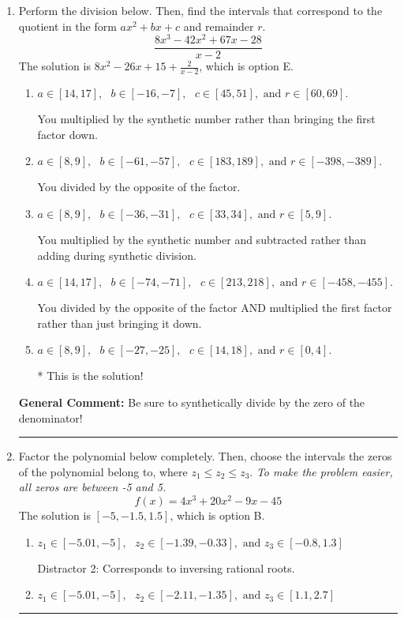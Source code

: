 \documentclass{extbook}[14pt]
\newcommand{\litem}[1]{\item #1

\rule{\textwidth}{0.4pt}}
\begin{document}
\begin{enumerate}\litem{
Perform the division below. Then, find the intervals that correspond to the quotient in the form $ax^2+bx+c$ and remainder $r$.
\[ \frac{8x^{3} -42 x^{2} +67 x -28}{x -2} \]The solution is \( 8x^{2} -26 x + 15 + \frac{2}{x -2} \), which is option E.\begin{enumerate}[label=\Alph*.]
\item \( a \in [14, 17], \text{   } b \in [-16, -7], \text{   } c \in [45, 51], \text{   and   } r \in [60, 69]. \)

 You multiplied by the synthetic number rather than bringing the first factor down.
\item \( a \in [8, 9], \text{   } b \in [-61, -57], \text{   } c \in [183, 189], \text{   and   } r \in [-398, -389]. \)

 You divided by the opposite of the factor.
\item \( a \in [8, 9], \text{   } b \in [-36, -31], \text{   } c \in [33, 34], \text{   and   } r \in [5, 9]. \)

 You multiplied by the synthetic number and subtracted rather than adding during synthetic division.
\item \( a \in [14, 17], \text{   } b \in [-74, -71], \text{   } c \in [213, 218], \text{   and   } r \in [-458, -455]. \)

 You divided by the opposite of the factor AND multiplied the first factor rather than just bringing it down.
\item \( a \in [8, 9], \text{   } b \in [-27, -25], \text{   } c \in [14, 18], \text{   and   } r \in [0, 4]. \)

* This is the solution!
\end{enumerate}

\textbf{General Comment:} Be sure to synthetically divide by the zero of the denominator!
}
\litem{
Factor the polynomial below completely. Then, choose the intervals the zeros of the polynomial belong to, where $z_1 \leq z_2 \leq z_3$. \textit{To make the problem easier, all zeros are between -5 and 5.}
\[ f(x) = 4x^{3} +20 x^{2} -9 x -45 \]The solution is \( [-5, -1.5, 1.5] \), which is option B.\begin{enumerate}[label=\Alph*.]
\item \( z_1 \in [-5.01, -5], \text{   }  z_2 \in [-1.39, -0.33], \text{   and   } z_3 \in [-0.8, 1.3] \)

 Distractor 2: Corresponds to inversing rational roots.
\item \( z_1 \in [-5.01, -5], \text{   }  z_2 \in [-2.11, -1.35], \text{   and   } z_3 \in [1.1, 2.7] \)


\end{enumerate}}
\end{enumerate}
\end{document}
